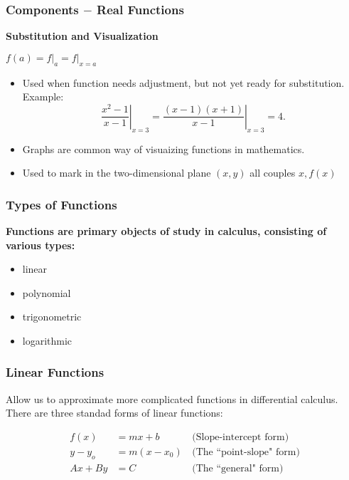 \documentclass{beamer}
\begin{document}
\begin{frame}[fragile]\frametitle{Components $-$ Real Functions}
\begin{center}\textbf{Substitution and Visualization} \end{center}

\vfill
\begin{center} $f(a) = f \vert_a  =  f \vert_{x=a}$ \end{center}

\vfill
\begin{itemize}
  \item Used when function needs adjustment, but not yet ready for substitution. Example:
  \begin{equation*}
    \left.\frac{x^2 - 1}{x-1}\right\rvert_{x=3} = \left.\frac{(x-1)(x+1)}{x-1}\right\rvert_{x=3} = 4.
  \end{equation*}
  \item Graphs are common way of visuaizing functions in mathematics.
  \item Used to mark in the two-dimensional plane $(x,y)$ all couples $x, f(x)$
  
\end{itemize}

\end{frame}

\begin{frame}[fragile]\frametitle{Types of Functions}

\vfill
\begin{center}\textbf{Functions are primary objects of study in calculus, consisting of various types:} \end{center}

\vfill
\begin{itemize}
\item linear
\item polynomial
\item trigonometric
\item logarithmic
\end{itemize}

\end{frame}

\begin{frame}[fragile]\frametitle{Linear Functions}

\vfill
Allow us to approximate more complicated functions in differential calculus. There are three standad forms of linear functions:

\vfill
\begin{align*}
  f(x) &= mx + b &\,\text{(Slope-intercept form)} \\
  y - y_o &= m(x - x_0) &\, \text{(The ``point-slope" form)} \\
  Ax + By &= C &\, \text{(The ``general" form)}
\end{align*}

\end{frame}
\end{document}
